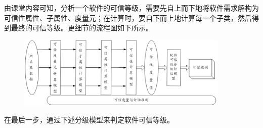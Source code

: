 \documentclass{article}
\begin{document}
由课堂内容可知，分析一个软件的可信等级，需要先自上而下地将软件需求解构为可信性属性、子属性、度量元；在计算时，要自下而上地计算每一个子类，然后得到最终的可信等级。更细节的流程图如下所示。

\begin{figure}[H]
	\centering
	\includegraphics[width=0.9\textwidth]{img/static_2.png}
\end{figure}

在最后一步，通过下述分级模型来判定软件可信等级。
\end{document}
